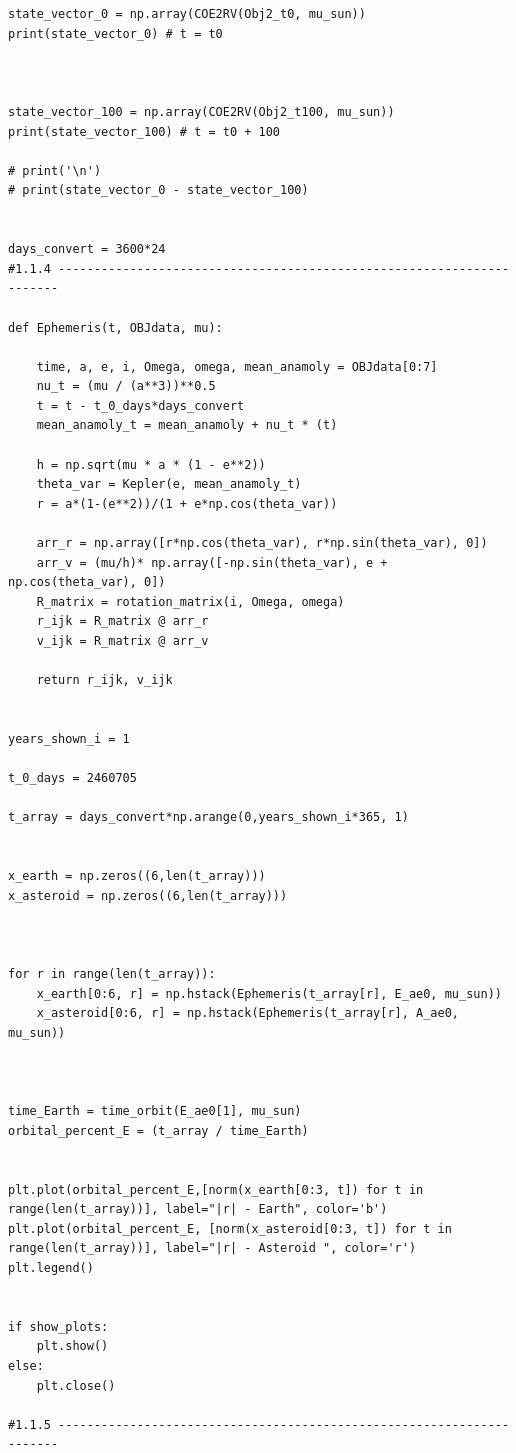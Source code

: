 \documentclass[a4paper, 12pt]{article}  %
\begin{document}
\begin{lstlisting}
state_vector_0 = np.array(COE2RV(Obj2_t0, mu_sun))
print(state_vector_0) # t = t0



state_vector_100 = np.array(COE2RV(Obj2_t100, mu_sun))
print(state_vector_100) # t = t0 + 100

# print('\n')
# print(state_vector_0 - state_vector_100)


days_convert = 3600*24
#1.1.4 ----------------------------------------------------------------------

def Ephemeris(t, OBJdata, mu):

    time, a, e, i, Omega, omega, mean_anamoly = OBJdata[0:7]
    nu_t = (mu / (a**3))**0.5
    t = t - t_0_days*days_convert
    mean_anamoly_t = mean_anamoly + nu_t * (t)

    h = np.sqrt(mu * a * (1 - e**2))
    theta_var = Kepler(e, mean_anamoly_t)
    r = a*(1-(e**2))/(1 + e*np.cos(theta_var))
    
    arr_r = np.array([r*np.cos(theta_var), r*np.sin(theta_var), 0])
    arr_v = (mu/h)* np.array([-np.sin(theta_var), e + np.cos(theta_var), 0])
    R_matrix = rotation_matrix(i, Omega, omega)
    r_ijk = R_matrix @ arr_r
    v_ijk = R_matrix @ arr_v
    
    return r_ijk, v_ijk


years_shown_i = 1

t_0_days = 2460705

t_array = days_convert*np.arange(0,years_shown_i*365, 1)


x_earth = np.zeros((6,len(t_array)))
x_asteroid = np.zeros((6,len(t_array)))


    
for r in range(len(t_array)):
    x_earth[0:6, r] = np.hstack(Ephemeris(t_array[r], E_ae0, mu_sun))
    x_asteroid[0:6, r] = np.hstack(Ephemeris(t_array[r], A_ae0, mu_sun))
    


time_Earth = time_orbit(E_ae0[1], mu_sun)
orbital_percent_E = (t_array / time_Earth) 


plt.plot(orbital_percent_E,[norm(x_earth[0:3, t]) for t in range(len(t_array))], label="|r| - Earth", color='b')
plt.plot(orbital_percent_E, [norm(x_asteroid[0:3, t]) for t in range(len(t_array))], label="|r| - Asteroid ", color='r')
plt.legend()


if show_plots:
    plt.show()
else:
    plt.close()

#1.1.5 ----------------------------------------------------------------------



\end{lstlisting}
\end{document}
